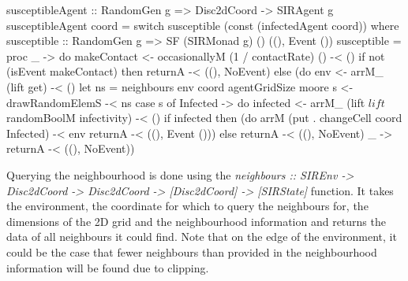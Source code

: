 \begin{HaskellCode}
susceptibleAgent :: RandomGen g => Disc2dCoord -> SIRAgent g
susceptibleAgent coord
    = switch susceptible (const (infectedAgent coord))
  where
    susceptible :: RandomGen g 
      => SF (SIRMonad g) () ((), Event ())
    susceptible = proc _ -> do
      makeContact <- occasionallyM (1 / contactRate) () -< ()
      if not (isEvent makeContact)
        then returnA -< ((), NoEvent)
        else (do
          env <- arrM_ (lift get) -< ()
          let ns = neighbours env coord agentGridSize moore
          s <- drawRandomElemS -< ns
          case s of
            Infected -> do
              infected <- arrM_ 
                (lift $ lift $ randomBoolM infectivity) -< ()
              if infected 
                then (do
                  arrM (put . changeCell coord Infected) -< env
                  returnA -< ((), Event ()))
                else returnA -< ((), NoEvent)
            _        -> returnA -< ((), NoEvent))

\end{HaskellCode}
Querying the neighbourhood is done using the \textit{neighbours :: SIREnv -> Disc2dCoord -> Disc2dCoord -> [Disc2dCoord] -> [SIRState]} function. It takes the environment, the coordinate for which to query the neighbours for, the dimensions of the 2D grid and the neighbourhood information and returns the data of all neighbours it could find. Note that on the edge of the environment, it could be the case that fewer neighbours than provided in the neighbourhood information will be found due to clipping.

